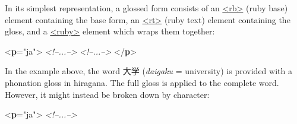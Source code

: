 In its simplest representation, a glossed form consists of an \hyperref[TEI.rb]{<rb>} (ruby base) element containing the base form, an \hyperref[TEI.rt]{<rt>} (ruby text) element containing the gloss, and a \hyperref[TEI.ruby]{<ruby>} element which wraps them together: \par\bgroup{}\exampleFont \begin{shaded}\noindent\mbox{}{<\textbf{p}\hspace*{1em}{xml:lang}="{ja}">}\mbox{}\newline 
\textit{<!--{\textJapanese ...}-->}\mbox{}\newline 
{}\mbox{}\newline 
\hspace*{1em}\mbox{}\newline 
\hspace*{1em}\mbox{}\newline 
{}\mbox{}\newline 
\textit{<!--{\textJapanese ...}-->}\mbox{}\newline 
{</\textbf{p}>}\end{shaded}\egroup\par \noindent  In the example above, the word {\textJapanese 大学} (\textit{daigaku} = university) is provided with a phonation gloss in hiragana. The full gloss is applied to the complete word. However, it might instead be broken down by character: \par\bgroup{}\exampleFont \begin{shaded}\noindent\mbox{}{<\textbf{p}\hspace*{1em}{xml:lang}="{ja}">}\mbox{}\newline 
\textit{<!--{\textJapanese ...}-->}\mbox{}\newline 

\end{shaded}
